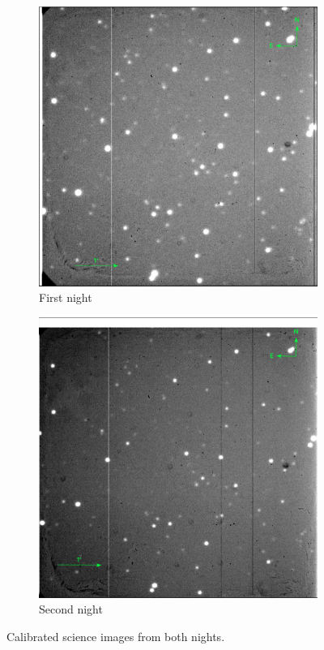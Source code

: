 \documentclass{article}
\begin{document}
    \begin{figure}
        \centering
        \begin{subfigure}[b]{0.45\textwidth}
            \centering
            \includegraphics[width=\textwidth]{sci1.png}
            \caption{First night}
            \label{fig:sci1}
        \end{subfigure}
        \hfill
        \begin{subfigure}[b]{0.45\textwidth}
            \centering
            \includegraphics[width=\textwidth]{sci2.png}
            \caption{Second night}
            \label{fig:sci2}
        \end{subfigure}
           \caption{Calibrated science images from both nights.}
           \label{fig:science}
   \end{figure}
\end{document}
